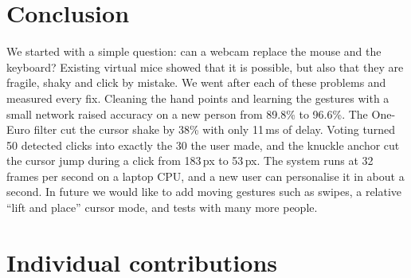 \section{Conclusion}
\label{sec:conclusion}

We started with a simple question: can a webcam replace the mouse and the
keyboard? Existing virtual mice showed that it is possible, but also that they
are fragile, shaky and click by mistake. We went after each of these problems
and measured every fix. Cleaning the hand points and learning the gestures
with a small network raised accuracy on a new person from 89.8\% to 96.6\%.
The One-Euro filter cut the cursor shake by 38\% with only 11\,ms of delay.
Voting turned 50 detected clicks into exactly the 30 the user made, and the
knuckle anchor cut the cursor jump during a click from 183\,px to 53\,px. The
system runs at 32 frames per second on a laptop CPU, and a new user can
personalise it in about a second. In future we would like to add moving
gestures such as swipes, a relative ``lift and place'' cursor mode, and tests
with many more people.

\section*{Individual contributions}

